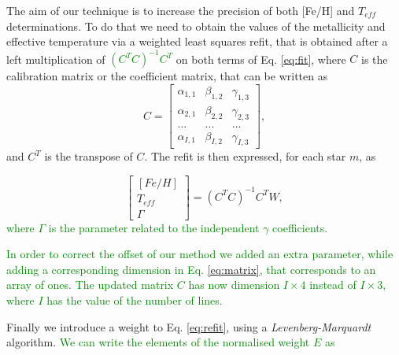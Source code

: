 \documentclass{aa}
\newcommand\T{\rule{0pt}{2.6ex}}
\begin{document}
The aim of our technique is to increase the precision of both [Fe/H] and $T_{eff}$ determinations. To do that we need to obtain the values of the metallicity and effective temperature via a weighted least squares refit, that is obtained after a left multiplication of \textcolor{green}{$(C^{T}C)^{-1}C^{T}$} on both terms of Eq. \ref{eq:fit}, where $C$ is the calibration matrix or the coefficient matrix, that can be written as
\begin{equation}
\label{eq:matrix}
C = \left[\begin{array}{ccc} \alpha_{1,1} & \beta_{1,2} & \gamma_{1,3} \\ \alpha_{2,1} & \beta_{2,2} & \gamma_{2,3} \\... & ... & ...\\ \alpha_{I,1} & \beta_{I,2} & \gamma_{I,3} \end{array}\right],
\end{equation}
and $C^{T}$ is the transpose of $C$. The refit is then expressed, for each star $m$, as

\begin{equation}
\label{eq:refit}
\left[\begin{array}{c} [Fe/H] \\T_{eff} \\ \Gamma \end{array}\right] =  (C^{T}C)^{-1}C^{T}W,
\end{equation}
\textcolor{green}{where $\Gamma$ is the parameter related to the independent  $\gamma$ coefficients.}

\textcolor{green}{In order to correct the offset of our method we added an extra parameter, while adding a corresponding dimension in Eq. \ref{eq:matrix}, that corresponds to an array of ones. The updated matrix $C$ has now dimension $I \times 4$ instead of $I \times 3$, where $I$ has the value of the number of lines.}



Finally we introduce a weight to Eq. \ref{eq:refit}, using a \textit{Levenberg-Marquardt} \citep[][]{Press-1992} algorithm. \textcolor{green}{We can write the elements of the normalised weight $E$ as}
\end{document}
